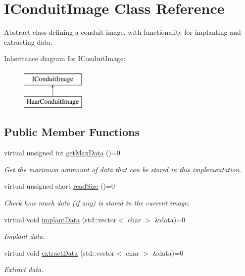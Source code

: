 \hypertarget{classefb_1_1IConduitImage}{
\section{IConduitImage Class Reference}
\label{classefb_1_1IConduitImage}
}


Abstract class defining a conduit image, with functionality for implanting and extracting data.  


Inheritance diagram for IConduitImage:\begin{figure}[H]
\begin{center}
\leavevmode
\includegraphics[height=2.000000cm]{classefb_1_1IConduitImage}
\end{center}
\end{figure}
\subsection*{Public Member Functions}
\begin{DoxyCompactItemize}
\item 
virtual unsigned int \hyperlink{classefb_1_1IConduitImage_adf25b030496042f8e063ad54806fcf9d}{getMaxData} ()=0
\begin{DoxyCompactList}\small\item\em Get the maximum ammount of data that can be stored in this implementation. \item\end{DoxyCompactList}\item 
virtual unsigned short \hyperlink{classefb_1_1IConduitImage_af4c6699ceacada4b0222ad4f1d1c384d}{readSize} ()=0
\begin{DoxyCompactList}\small\item\em Check how much data (if any) is stored in the current image. \item\end{DoxyCompactList}\item 
virtual void \hyperlink{classefb_1_1IConduitImage_aead78fe96a2ec4e676c7aaf018427671}{implantData} (std::vector$<$ char $>$ \&data)=0
\begin{DoxyCompactList}\small\item\em Implant data. \item\end{DoxyCompactList}\item 
virtual void \hyperlink{classefb_1_1IConduitImage_a920c1ba3f4f8d7531a8b6f8c8b38def6}{extractData} (std::vector$<$ char $>$ \&data)=0
\begin{DoxyCompactList}\small\item\em Extract data. \item\end{DoxyCompactList}\end{DoxyCompactItemize}


